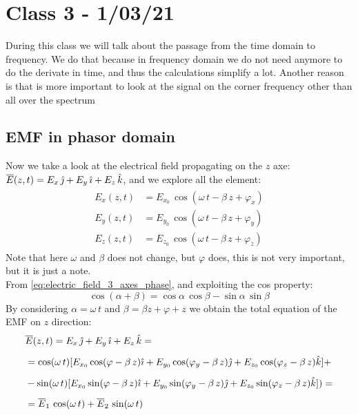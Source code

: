 \section{Class 3 - 1/03/21}
During this class we will talk about the passage from the time domain to frequency. We do that because in frequency domain we do not need anymore to do the derivate in time, and thus the calculations simplify a lot. Another reason is that is more important to look at the signal on the corner frequency other than all over the spectrum
\subsection*{EMF in phasor domain}
Now we take a look at the electrical field propagating on the $z$ axe: $\overline{E}(z,t)=E_x\,\hat{\jmath}+E_y\,\hat{\imath}+E_z\,\hat{\mathnormal{k}}$, and we explore all the element:
\begin{align}\label{eq:electric_field_3_axes_phase}
    \begin{split}
        E_x(z,t)&=E_{x_0}\,\cos(\omega\,t-\beta\,z+\varphi_x)\\[5pt]
        E_y(z,t)&=E_{y_0}\,\cos(\omega\,t-\beta\,z+\varphi_y)\\[5pt]
        E_z(z,t)&=E_{z_0}\,\cos(\omega\,t-\beta\,z+\varphi_z)
    \end{split}
\end{align}
Note that here $\omega$ and $\beta$ does not change, but $\varphi$ does, this is not very important, but it is just a note.\\
From \cref{eq:electric_field_3_axes_phase}, and exploiting the cos property:
\begin{equation*}
    \cos(\alpha + \beta )=\cos\alpha\, \cos\beta - \sin\alpha \, \sin\beta
\end{equation*}
By considering $\alpha = \omega\, t$ and $\beta = \beta z+\varphi+z$ we obtain the total equation of the EMF on $z$ direction:
\begin{align}
    \begin{split}
        &\overline{E}(z,t)=E_x\,\hat{\jmath}+E_y\,\hat{\imath}+E_z\,\hat{\mathnormal{k}}=\\[5pt]
        &=\cos(\omega\,t)[E_{x_0}\cos(\varphi-\beta\,z)\hat{\imath}+E_{y_0}\cos(\varphi_y-\beta\,z)\hat{\jmath}+E_{z_0}\cos(\varphi_z-\beta\,z)\hat{\mathnormal{k}}]+\\[5pt]
        &-\sin(\omega\,t)[E_{x_0}\sin(\varphi-\beta\,z)\hat{\imath}+E_{y_0}\sin(\varphi_y-\beta\,z)\hat{\jmath}+E_{z_0}\sin(\varphi_z-\beta\,z)\hat{\mathnormal{k}}])=\\[5pt]
        &=\overline{E}_1\,\cos(\omega\,t)+\overline{E}_2\,\sin(\omega\,t)
    \end{split}
\end{align}
